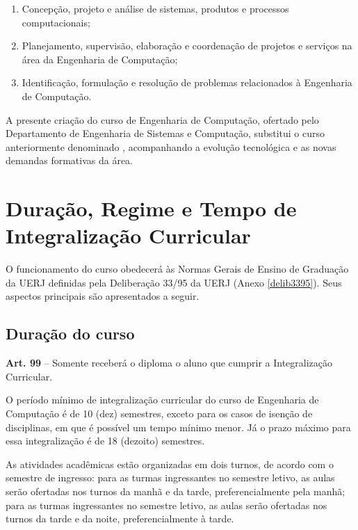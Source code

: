 \begin{enumerate}
  \item Concepção, projeto e análise de sistemas, produtos e processos computacionais;
  \item Planejamento, supervisão, elaboração e coordenação de projetos e serviços na área da Engenharia de Computação;
  \item Identificação, formulação e resolução de problemas relacionados à Engenharia de Computação.
\end{enumerate}

A presente criação do curso de Engenharia de Computação, ofertado pelo Departamento de Engenharia de Sistemas e Computação, substitui o curso anteriormente denominado \cursoatual, acompanhando a evolução tecnológica e as novas demandas formativas da área.

\section{Duração, Regime e Tempo de Integralização Curricular}

O funcionamento do curso obedecerá às Normas Gerais de Ensino de Graduação da UERJ definidas pela Deliberação  33/95 da UERJ (Anexo \ref{delib3395}). Seus aspectos principais são apresentados a seguir.

\subsection{Duração do curso}
\label{sec:integralizacao}
\begin{itquotation}
  \textbf{Art. 99} -- Somente receberá o diploma o aluno que cumprir a Integralização Curricular.
\end{itquotation}

O período mínimo de integralização curricular do curso de Engenharia de Computação  é de 10 (dez) semestres, exceto para os casos de isenção de disciplinas, em que é possível um tempo mínimo menor. Já o prazo máximo para essa integralização é de 18 (dezoito) semestres.

As atividades acadêmicas estão organizadas em dois turnos, de acordo com o semestre de ingresso: para as turmas ingressantes no  semestre letivo, as aulas serão ofertadas nos turnos da manhã e da tarde, preferencialmente pela manhã; para as turmas ingressantes no  semestre letivo, as aulas serão ofertadas nos turnos da tarde e da noite, preferencialmente à tarde.

